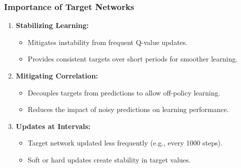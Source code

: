 \documentclass[aspectratio=169]{beamer}
\begin{document}
\begin{frame}[fragile]
    \frametitle{Importance of Target Networks}
    \begin{enumerate}
        \item \textbf{Stabilizing Learning:}
            \begin{itemize}
                \item Mitigates instability from frequent Q-value updates.
                \item Provides consistent targets over short periods for smoother learning.
            \end{itemize}

        \item \textbf{Mitigating Correlation:}
            \begin{itemize}
                \item Decouples targets from predictions to allow off-policy learning.
                \item Reduces the impact of noisy predictions on learning performance.
            \end{itemize}
            
        \item \textbf{Updates at Intervals:}
            \begin{itemize}
                \item Target network updated less frequently (e.g., every 1000 steps).
                \item Soft or hard updates create stability in target values.
            \end{itemize}
    \end{enumerate}
\end{frame}
\end{document}
